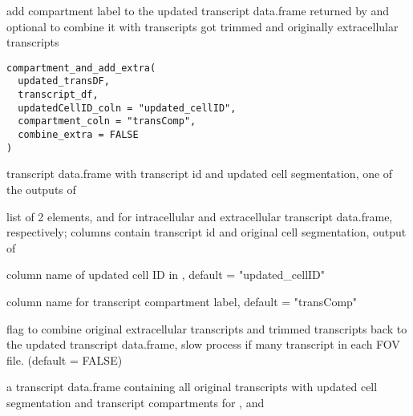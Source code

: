 \documentclass[letterpaper]{book}
\begin{document}
%
\begin{Description}
add compartment label to the updated transcript data.frame returned by  and optional to combine it with transcripts got trimmed and originally extracellular transcripts
\end{Description}
%
\begin{Usage}
\begin{verbatim}
compartment_and_add_extra(
  updated_transDF,
  transcript_df,
  updatedCellID_coln = "updated_cellID",
  compartment_coln = "transComp",
  combine_extra = FALSE
)
\end{verbatim}
\end{Usage}
%
\begin{Arguments}
\begin{ldescription}
\item[\code{updated\_transDF}] transcript data.frame with transcript id and updated cell segmentation, one of the outputs  of 

\item[\code{transcript\_df}] list of 2 elements,  and  for intracellular and extracellular transcript data.frame, respectively; columns contain transcript id and original cell segmentation, output of 

\item[\code{updatedCellID\_coln}] column name of updated cell ID in , default = "updated\_cellID"

\item[\code{compartment\_coln}] column name for transcript compartment label, default = "transComp"

\item[\code{combine\_extra}] flag to combine original extracellular transcripts and trimmed transcripts back to the updated transcript data.frame, slow process if many transcript in each FOV file. (default = FALSE)
\end{ldescription}
\end{Arguments}
%
\begin{Value}
a transcript data.frame containing all original transcripts with updated cell segmentation and transcript compartments for ,  and 
\end{Value}
\end{document}
